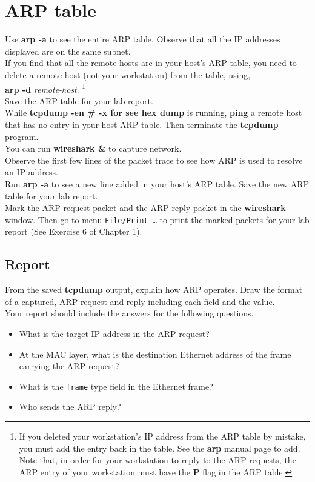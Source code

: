 \documentclass[10pt,a4paper]{article}
\numberwithin{equation}{section}
\numberwithin{figure}{section}
\numberwithin{table}{section}
\begin{document}
\section{ARP table}
    Use \textbf{arp -a} to see the entire ARP table.
    Observe that all the IP addresses displayed are on the same subnet. \\
    If you find that all the remote hosts are in your host’s ARP table, you need to delete a remote host (not your workstation) from the table, using, \\
    \textbf{arp -d} \textit{remote-host}. \footnote{If you deleted your workstation’s IP address from the ARP table by mistake, you must add the entry back in the table. See the \textbf{arp} manual page to add.
    Note that, in order for your workstation to reply to the ARP requests, the ARP entry of your workstation must have the \textbf{P} flag in the ARP table.} \\
    Save the ARP table for your lab report. \\
    While \textbf{tcpdump -en \# -x for see hex dump} is running, \textbf{ping} a remote host that has no entry in your host ARP table.
    Then terminate the \textbf{tcpdump} program. \\
    You can run \textbf{wireshark \&} to capture network. \\
    Observe the first few lines of the packet trace to see how ARP is used to resolve an IP address. \\
    Run \textbf{arp -a} to see a new line added in your host’s ARP table.
    Save the new ARP table for your lab report. \\
    Mark the ARP request packet and the ARP reply packet in the \textbf{wireshark} window.
    Then go to menu \texttt{File/Print \ldots} to print the marked packets for your lab report (See Exercise 6 of Chapter 1). \\
    \subsection*{Report}
    From the saved \textbf{tcpdump} output, explain how ARP operates.
    Draw the format of a captured, ARP request and reply including each field and the value. \\
    Your report should include the answers for the following questions.
    \begin{itemize}
        \item What is the target IP address in the ARP request?
        \item At the MAC layer, what is the destination Ethernet address of the frame carrying the ARP request?
        \item What is the \texttt{frame} type field in the Ethernet frame?
        \item Who sends the ARP reply?
    \end{itemize}
\end{document}
